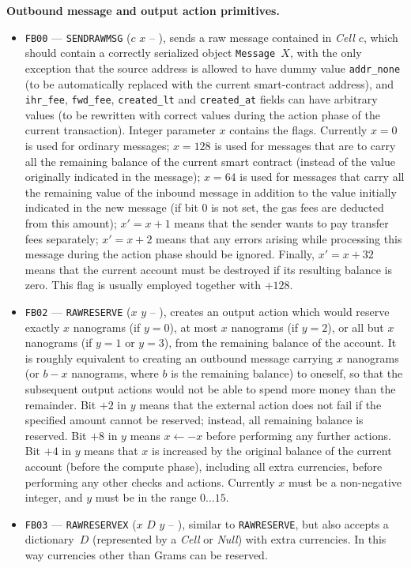 \documentclass[12pt,oneside]{article}
\def\makepoint#1{\medbreak\noindent{\bf #1.\ }}
\def\nxsubpoint{\refstepcounter{subsubsection}%
    \smallbreak\makepoint{\thesubsubsection}}
\def\emb#1{\textbf{#1.}}
\begin{document}
\nxsubpoint\emb{Outbound message and output action primitives}
\begin{itemize}
\item {\tt FB00} --- {\tt SENDRAWMSG} ($c$ $x$ -- ), sends a raw message contained in {\em Cell $c$}, which should contain a correctly serialized object {\tt Message $X$}, with the only exception that the source address is allowed to have dummy value {\tt addr\_none} (to be automatically replaced with the current smart-contract address), and {\tt ihr\_fee}, {\tt fwd\_fee}, {\tt created\_lt} and {\tt created\_at} fields can have arbitrary values (to be rewritten with correct values during the action phase of the current transaction). Integer parameter $x$ contains the flags. Currently $x=0$ is used for ordinary messages; $x=128$ is used for messages that are to carry all the remaining balance of the current smart contract (instead of the value originally indicated in the message); $x=64$ is used for messages that carry all the remaining value of the inbound message in addition to the value initially indicated in the new message (if bit 0 is not set, the gas fees are deducted from this amount); $x'=x+1$ means that the sender wants to pay transfer fees separately; $x'=x+2$ means that any errors arising while processing this message during the action phase should be ignored. Finally, $x'=x+32$ means that the current account must be destroyed if its resulting balance is zero. This flag is usually employed together with $+128$.
\item {\tt FB02} --- {\tt RAWRESERVE} ($x$ $y$ -- ), creates an output action which would reserve exactly $x$ nanograms (if $y=0$), at most $x$ nanograms (if $y=2$), or all but $x$ nanograms (if $y=1$ or $y=3$), from the remaining balance of the account. It is roughly equivalent to creating an outbound message carrying $x$ nanograms (or $b-x$ nanograms, where $b$ is the remaining balance) to oneself, so that the subsequent output actions would not be able to spend more money than the remainder. Bit $+2$ in $y$ means that the external action does not fail if the specified amount cannot be reserved; instead, all remaining balance is reserved. Bit $+8$ in $y$ means $x\leftarrow -x$ before performing any further actions. Bit $+4$ in $y$ means that $x$ is increased by the original balance of the current account (before the compute phase), including all extra currencies, before performing any other checks and actions. Currently $x$ must be a non-negative integer, and $y$ must be in the range $0\ldots 15$.
\item {\tt FB03} --- {\tt RAWRESERVEX} ($x$ $D$ $y$ -- ), similar to {\tt RAWRESERVE}, but also accepts a dictionary~$D$ (represented by a {\em Cell\/} or {\em Null\/}) with extra currencies. In this way currencies other than Grams can be reserved.

\end{itemize}
\end{document}
